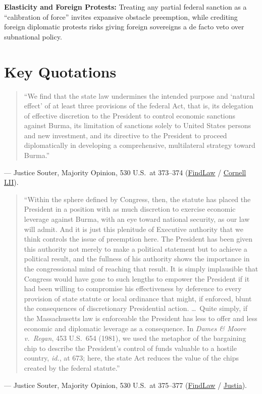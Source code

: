 \documentclass[12pt]{article}
\begin{document}
\textbf{Elasticity and Foreign Protests:} Treating any partial federal sanction as a ``calibration of force'' invites expansive obstacle preemption, while crediting foreign diplomatic protests risks giving foreign sovereigns a de facto veto over subnational policy.

\section{Key Quotations}
\begin{quote}
``We find that the state law undermines the intended purpose and `natural effect' of at least three provisions of the federal Act, that is, its delegation of effective discretion to the President to control economic sanctions against Burma, its limitation of sanctions solely to United States persons and new investment, and its directive to the President to proceed diplomatically in developing a comprehensive, multilateral strategy toward Burma.''
\end{quote}
\noindent --- Justice Souter, Majority Opinion, 530 U.S.\ at 373--374 (\href{https://caselaw.findlaw.com/court/us-supreme-court/530/363.html}{FindLaw} / \href{https://www.law.cornell.edu/supct/html/99-474.ZO.html}{Cornell LII}).

\begin{quote}
``Within the sphere defined by Congress, then, the statute has placed the President in a position with as much discretion to exercise economic leverage against Burma, with an eye toward national security, as our law will admit. And it is just this plenitude of Executive authority that we think controls the issue of preemption here. The President has been given this authority not merely to make a political statement but to achieve a political result, and the fullness of his authority shows the importance in the congressional mind of reaching that result. It is simply implausible that Congress would have gone to such lengths to empower the President if it had been willing to compromise his effectiveness by deference to every provision of state statute or local ordinance that might, if enforced, blunt the consequences of discretionary Presidential action. \dots\ Quite simply, if the Massachusetts law is enforceable the President has less to offer and less economic and diplomatic leverage as a consequence. In \textit{Dames \& Moore v.\ Regan}, 453 U.S.\ 654 (1981), we used the metaphor of the bargaining chip to describe the President's control of funds valuable to a hostile country, \textit{id.}, at 673; here, the state Act reduces the value of the chips created by the federal statute.''
\end{quote}
\noindent --- Justice Souter, Majority Opinion, 530 U.S.\ at 375--377 (\href{https://caselaw.findlaw.com/court/us-supreme-court/530/363.html}{FindLaw} / \href{https://supreme.justia.com/cases/federal/us/530/363/}{Justia}).
\end{document}
